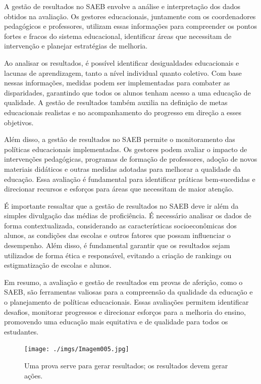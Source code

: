 A gestão de resultados no SAEB envolve a análise e interpretação dos
dados obtidos na avaliação. Os gestores educacionais, juntamente com os
coordenadores pedagógicos e professores, utilizam essas informações para
compreender os pontos fortes e fracos do sistema educacional,
identificar áreas que necessitam de intervenção e planejar estratégias
de melhoria.

Ao analisar os resultados, é possível identificar desigualdades
educacionais e lacunas de aprendizagem, tanto a nível individual quanto
coletivo. Com base nessas informações, medidas podem ser implementadas
para combater as disparidades, garantindo que todos os alunos tenham
acesso a uma educação de qualidade. A gestão de resultados também
auxilia na definição de metas educacionais realistas e no acompanhamento
do progresso em direção a esses objetivos.

Além disso, a gestão de resultados no SAEB permite o monitoramento das
políticas educacionais implementadas. Os gestores podem avaliar o
impacto de intervenções pedagógicas, programas de formação de
professores, adoção de novos materiais didáticos e outras medidas
adotadas para melhorar a qualidade da educação. Essa avaliação é
fundamental para identificar práticas bem-sucedidas e direcionar
recursos e esforços para áreas que necessitam de maior atenção.

É importante ressaltar que a gestão de resultados no SAEB deve ir além
da simples divulgação das médias de proficiência. É necessário analisar
os dados de forma contextualizada, considerando as características
socioeconômicas dos alunos, as condições das escolas e outros fatores
que possam influenciar o desempenho. Além disso, é fundamental garantir
que os resultados sejam utilizados de forma ética e responsável,
evitando a criação de rankings ou estigmatização de escolas e alunos.

Em resumo, a avaliação e gestão de resultados em provas de aferição,
como o SAEB, são ferramentas valiosas para a compreensão da qualidade da
educação e o planejamento de políticas educacionais. Essas avaliações
permitem identificar desafios, monitorar progressos e direcionar
esforços para a melhoria do ensino, promovendo uma educação mais
equitativa e de qualidade para todos os estudantes.

\begin{figure}
\centering
\texttt{[image: ./imgs/Imagem005.jpg]}
\caption{Uma prova serve para gerar resultados; os resultados devem
gerar ações.}
\end{figure}

